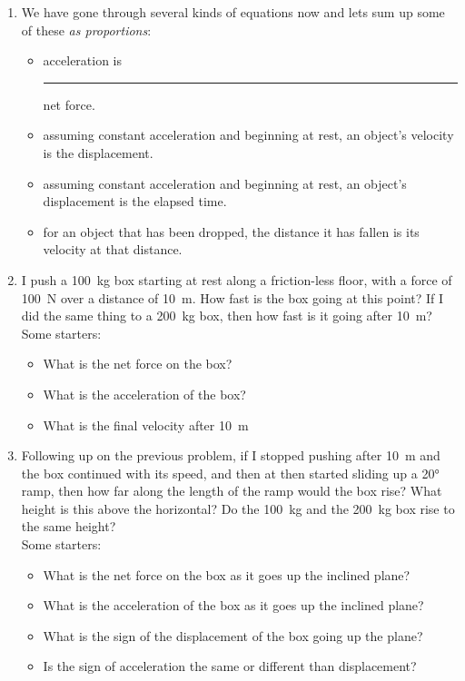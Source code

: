 \begin{enumerate}
\setlength\itemsep{1 in}

\item 
We have gone through several kinds of equations now and lets sum up some of these \emph{as proportions}:
\begin{itemize}
	\setlength\itemsep{.5 in}
	\item acceleration is \rule{1in}{0.1mm} net force.
	\item assuming constant acceleration and beginning at rest, an object's velocity is \blank the displacement.
	\item assuming constant acceleration and beginning at rest, an object's displacement is \blank the elapsed time.
	\item for an object that has been dropped, the distance it has fallen is \blank its velocity at that distance.
\end{itemize} 
\medskip

\item
I push a \SI{100}{kg} box starting at rest along a friction-less floor, with a force of \SI{100}{\newton} over a distance of \SI{10}{m}. How fast is the box going at this point? If I did the same thing to a \SI{200}{kg} box, then how fast is it going after \SI{10}{m}?\\
Some starters:
\begin{itemize}
	\item What is the net force on the box?
	\item What is the acceleration of the box?
	\item What is the final velocity after \SI{10}{\meter}
\end{itemize}
\hugeskip


\item
Following up on the previous problem, if I stopped pushing after \SI{10}{m} and the box continued with its speed, and then at then started sliding up a \ang{20} ramp, then how far along the length of the ramp would the box rise? What height is this above the horizontal?  Do the \SI{100}{kg} and the \SI{200}{kg} box rise to the same height?\\
Some starters:
\begin{itemize}
	\item What is the net force on the box as it goes up the inclined plane?
	\item What is the acceleration of the box as it goes up the inclined plane?
	\item What is the sign of the displacement of the box going up the plane?
	\item Is the sign of acceleration the same or different than displacement? 
\end{itemize}
\hugeskip


\end{enumerate}

